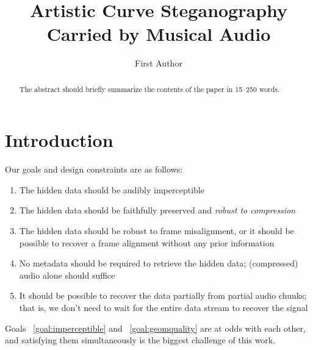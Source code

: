 \documentclass[runningheads]{llncs}
\begin{document}
%
\title{Artistic Curve Steganography Carried by Musical Audio}
%
%
\author{First Author}
%
%
%
\maketitle              %
%
\begin{abstract}
The abstract should briefly summarize the contents of the paper in
15--250 words.

\end{abstract}
%
%
%
\section{Introduction}



Our goals and design constraints are as follows:
\begin{enumerate}
    \item \label{goal:imperceptible} The hidden data should be audibly imperceptible
    \item \label{goal:geomquality} The hidden data should be faithfully preserved and {\em robust to compression}
    \item \label{goal:misalignment} The hidden data should be robust to frame misalignment, or it should be possible to recover a frame alignment without any prior information
    \item \label{goal:metadata} No metadata should be required to retrieve the hidden data; (compressed) audio alone should suffice
    \item \label{goal:partial} It should be possible to recover the data partially from partial audio chunks; that is, we don't need to wait for the entire data stream to recover the signal
\end{enumerate}

Goals ~\ref{goal:imperceptible} and ~\ref{goal:geomquality} are at odds with each other, and satisfying them simultaneously is the biggest challenge of this work.
\end{document}
